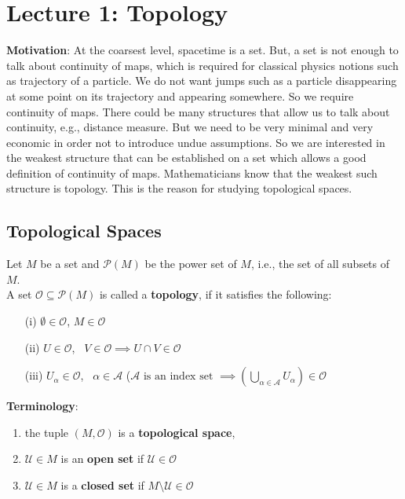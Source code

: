 \section{Lecture 1: Topology}

\begin{framed}
\textbf{Motivation}: At the coarsest level, spacetime is a set. But, a set  is not enough to talk about continuity of maps, which is required for classical physics notions such as trajectory of a particle. We do not want jumps such as a particle disappearing at some point on its trajectory and appearing somewhere. So we require continuity of maps. There could be many structures that allow us to talk about continuity, e.g., distance measure. But we need to be very minimal and very economic in order not to introduce undue assumptions. So we are interested in the weakest structure that can be established on a set which allows a good definition of continuity of maps. Mathematicians know that the weakest such structure is topology. This is the reason for studying topological spaces.
\end{framed}

\subsection{Topological Spaces}

\begin{definition}
  Let $M$ be a set and $\mathcal{P}(M)$ be the power set of $M$, i.e., the set of all subsets of $M$.   \\
A set $\mathcal{O} \subseteq \mathcal{P}(M)$ is called a \textbf{topology}, if it satisfies the following:
\begin{enumerate}
  \item[(i)] $\emptyset \in \mathcal{O}$, $M \in \mathcal{O}$ 
\item[(ii)] $U \in \mathcal{O}$, \, $V \in \mathcal{O} \implies U \cap V \in \mathcal{O}$ 
\item[(iii)] $U_{\alpha} \in \mathcal{O}$, \, $\alpha \in \mathcal{A}$ ($\mathcal{A} \text{ is an index set } \implies \left( \bigcup_{\alpha \in \mathcal{A}} U_{\alpha} \right) \in \mathcal{O}$
\end{enumerate}
\end{definition}

\textbf{Terminology}:
\begin{enumerate}
\item the tuple $(M , \mathcal{O})$ is a \textbf{topological space},
\item $\mathcal{U} \in M$ is an \textbf{open set} if $\mathcal{U} \in \mathcal{O}$
\item $\mathcal{U} \in M$ is a \textbf{closed set} if $M \setminus \mathcal{U} \in \mathcal{O}$
\end{enumerate}


